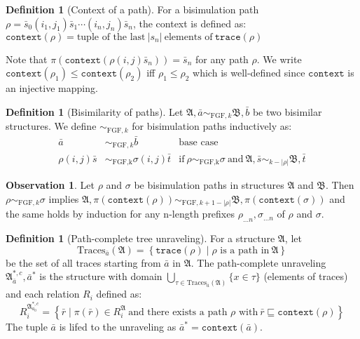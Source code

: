 \documentclass[draft]{scrartcl}
\theoremstyle{definition}
\newtheorem{definition}[theorem]{Definition}
\newtheorem{observation}[theorem]{Observation}
\newcommand{\trace}[1]{\mathtt{trace}(#1)}
\newcommand{\context}[1]{\mathtt{context}(#1)}
\newcommand{\struct}[1]{$\mathfrak{#1}$}
\begin{document}
\begin{definition}[Context of a path]
  For a bisimulation path $\rho = \bar{s}_{0}(i_{1}, j_{1})\bar{s}_{1}\cdots{}(i_{n}, j_{n})\bar{s}_{n}$, the context is defined as: $\context{\rho} = \text{tuple of the last}\ |s_{n}|\ \text{elements of}\ \trace{\rho}$
\end{definition}

Note that $\pi(\context{\rho (i,j) \bar{s}_{n}}) = \bar{s}_{n}$ for any path $\rho$.
We write $\context{\rho_{1}} \le \context{\rho_{2}}$ iff $\rho_{1} \le \rho_{2}$ which is well-defined since $\mathtt{context}$ is an injective mapping.

\begin{definition}[Bisimilarity of paths]
  Let $\mathfrak{A},\bar{a} \sim_{\textrm{FGF},k} \mathfrak{B}, \bar{b}$ be two bisimilar structures.
  We define $\sim_{\textrm{FGF},k}$ for bisimulation paths inductively as:
  \begin{align*}
    \bar{a} &\sim_{\textrm{FGF},k} \bar{b} & \text{base case} \\
    \rho (i,j) \bar{s} &\sim_{\textrm{FGF,k}} \sigma (i,j) \bar{t} & \text{if}\ \rho \sim_{\textrm{FGF,k}} \sigma \ \text{and}\ \mathfrak{A},\bar{s} \sim_{k-|\rho|} \mathfrak{B},\bar{t}
  \end{align*}
\end{definition}

\begin{observation}\label{obs:path-context-bisim}
  Let $\rho$ and $\sigma$ be bisimulation paths in structures $\mathfrak{A}$ and $\mathfrak{B}$.
  Then $\rho \sim_{\textrm{FGF},k} \sigma$ implies $\mathfrak{A}, \pi(\context{\rho}) \sim_{\textrm{FGF},k+1-|\rho|} \mathfrak{B}, \pi(\context{\sigma})$ and the same holds by induction for any n-length prefixes $\rho_{\ldots{}n}, \sigma_{\ldots{}n}$ of $\rho$ and $\sigma$.
\end{observation}

\begin{definition}[Path-complete tree unraveling]
  For a structure \struct{A}, let
  \begin{equation*}
    \text{Traces}_{\bar{a}}(\mathfrak{A}) = \left\{ \trace{\rho} \mid \text{$\rho$ is a path in}\ \mathfrak{A} \right\}
  \end{equation*}
  be the set of all traces starting from $\bar{a}$ in $\mathfrak{A}$.
  The path-complete unraveling $\mathfrak{A}^{*,c}_{\bar{a}}, \bar{a}^{*}$ is the structure with domain $\bigcup_{\tau \in \text{Traces}_{\bar{a}}(\mathfrak{A})} \{ x \in \tau \}$ (elements of traces) and each relation $R_{i}$ defined as:
  \begin{equation*}
    R_{i}^{\mathfrak{A}^{*,c}_{a_{0}}} = \left\{ \bar{r} \mid \pi(\bar{r}) \in R_{i}^{\mathfrak{A}}\ \text{and there exists a path $\rho$ with}\ \bar{r} \sqsubseteq \context{\rho}\right\}
  \end{equation*}
  The tuple $\bar{a}$ is lifed to the unraveling as $\bar{a}^{*} = \context{\bar{a}}$.
\end{definition}
\end{document}
